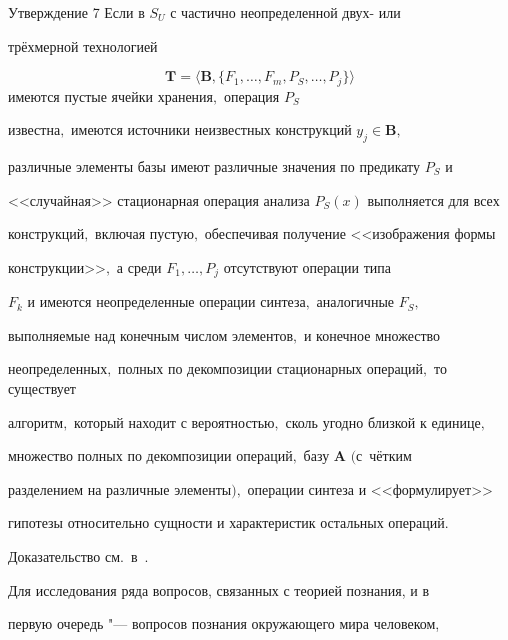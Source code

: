 \smallskip



\hypertarget{kr:utv7}{}



\begin{newthm}{Утверждение 7} Если в $S_{U}$ с частично неопределенной двух- или

трёхмерной технологией 

$$\mathbf{T} =\langle \mathbf{B}, \{F_{1},\ldots, F_{m},

P_{S},\ldots, P_{j}\}\rangle$$ имеются пустые ячейки хранения$,$ операция $P_{S}$

известна$,$ имеются источники неизвестных конструкций $y_{j} \in  \mathbf{B},$

различные элементы базы имеют различные значения по предикату $P_{S}$ и

<<случайная>> стационарная операция анализа $P_{S}(x)$ выполняется для всех

конструкций$,$ включая пустую$,$ обеспечивая получение <<изображения формы

конструкции>>$,$ а среди $F_{1},\ldots, P_{j}$ отсутствуют операции типа

$F_{k}$ и имеются неопределенные операции синтеза$,$ аналогичные $F_{S},$

выполняемые над конечным числом элементов$,$ и конечное множество

неопределенных$,$ полных по декомпозиции стационарных опе\-ра\-ций$,$ то существует

алгоритм$,$ который находит с вероятностью$,$ сколь угодно близкой к единице$,$

множество полных по декомпозиции операций$,$ базу $\mathbf{ A }$ $($с~чётким

разделением на различные элементы$),$ операции синтеза и <<формулирует>>

гипотезы относительно сущности и характеристик остальных операций$.$

\end{newthm}



\smallskip



Доказательство см.~в~\cite{krylov:bib3}.



\smallskip



Для исследования ряда вопросов, связанных с теорией познания, и в

пер\-вую очередь "--- вопросов познания окружающего мира человеком,

